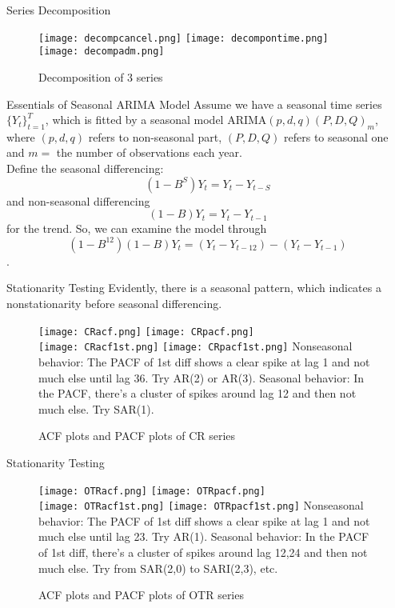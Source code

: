 \documentclass[11pt]{beamer}
\begin{document}
\begin{frame} {Series Decomposition}

\center
\begin{figure}
\texttt{[image: decompcancel.png]} 
\texttt{[image: decompontime.png]} \\
\texttt{[image: decompadm.png]} 
\caption{Decomposition of 3 series}
\end{figure}
\end{frame}

\begin{frame} {Essentials of Seasonal ARIMA Model}
Assume we have a seasonal time series $\{Y_t\}^T_{t=1}$, which is fitted by a seasonal model ARIMA$(p,d,q)(P,D,Q)_m$,  where $(p,d,q)$ refers to non-seasonal part, $(P,D,Q)$ refers to seasonal one and $m=$ the number of observations each year. \\
Define the seasonal differencing: $$(1-B^S)Y_t=Y_t-Y_{t-S}$$ and non-seasonal differencing $$(1-B)Y_t=Y_t-Y_{t-1}$$ for the trend.
So, we can examine the model through $$(1-B^{12})(1-B)Y_t=(Y_t-Y_{t-{12}})-(Y_t-Y_{t-1})$$.
\end{frame}

\begin{frame} {Stationarity Testing}
Evidently, there is a seasonal pattern, which indicates a nonstationarity before seasonal differencing.
\begin{figure}
\texttt{[image: CRacf.png]} 
\texttt{[image: CRpacf.png]} \\
\texttt{[image: CRacf1st.png]} 
\texttt{[image: CRpacf1st.png]} 
{\center \small Nonseasonal behavior: The PACF of 1st diff shows a clear spike at lag 1 and not much else until lag 36.  Try AR(2) or AR(3).  Seasonal behavior: In the PACF,  there’s a cluster of spikes around lag 12 and then not much else.  Try SAR(1). }
\caption{ACF plots and PACF plots of CR series}
\end{figure}
\end{frame}

\begin{frame} {Stationarity Testing}
\begin{figure}
\texttt{[image: OTRacf.png]} 
\texttt{[image: OTRpacf.png]} \\
\texttt{[image: OTRacf1st.png]} 
\texttt{[image: OTRpacf1st.png]} 
{\center \small Nonseasonal behavior: The PACF of 1st diff shows a clear spike at lag 1 and not much else until lag 23.  Try AR(1).  Seasonal behavior: In the PACF of 1st diff,  there’s a cluster of spikes around lag 12,24 and then not much else.  Try from SAR(2,0) to SARI(2,3), etc. }
\caption{ACF plots and PACF plots of OTR series}
\end{figure}
\end{frame}
\end{document}
